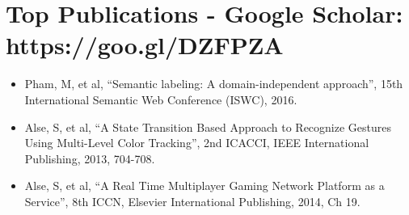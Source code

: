 \newcommand\textlcsc[1]{\textsc{\MakeTextLowercase{#1}}}
\section{Top Publications - \normalsize{Google Scholar: }\textup{https://goo.gl/DZFPZA}}
\begin{itemize}
\setlength\itemsep{-5pt}
\item Pham, M, et al, ``Semantic labeling: A domain-independent approach'', 15th International Semantic Web Conference (ISWC), 2016.
\item Alse, S, et al, ``A State Transition Based Approach to Recognize Gestures Using Multi-Level Color Tracking'', 2nd ICACCI, IEEE International Publishing, 2013, 704-708.
\item Alse, S, et al, ``A Real Time Multiplayer Gaming Network Platform as a Service'', 8th ICCN, Elsevier International Publishing, 2014, Ch 19.
\end{itemize}
